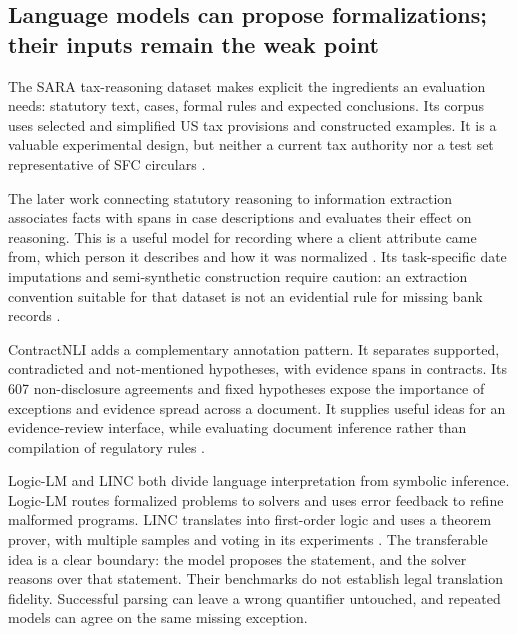 \subsection{Language models can propose formalizations; their inputs remain the weak point}
\label{merge:P-02-literature:07}


The SARA tax-reasoning dataset makes explicit the ingredients an evaluation needs:
statutory text, cases, formal rules and expected conclusions. Its corpus uses
selected and simplified US tax provisions and constructed examples. It is a
valuable experimental design, but neither a current tax authority nor a test set
representative of SFC circulars \citep[secs.~2--3]{sara2020}.

The later work connecting statutory reasoning to information extraction associates
facts with spans in case descriptions and evaluates their effect on reasoning.
This is a useful model for recording where a client attribute came from, which
person it describes and how it was normalized
\citep[secs.~3--5]{connecting2023}. Its task-specific date imputations and
semi-synthetic construction require caution: an extraction convention suitable
for that dataset is not an evidential rule for missing bank records
\citep[sec.~7 and apps.~B, E]{connecting2023}.


ContractNLI adds a complementary annotation pattern. It separates supported,
contradicted and not-mentioned hypotheses, with evidence spans in contracts.
Its 607 non-disclosure agreements and fixed hypotheses expose the importance of
exceptions and evidence spread across a document. It supplies useful ideas for
an evidence-review interface, while evaluating document inference rather than
compilation of regulatory rules \citep[secs.~2--5]{contractnli2021}.

Logic-LM and LINC both divide language interpretation from symbolic inference.
Logic-LM routes formalized problems to solvers and uses error feedback to refine
malformed programs. LINC translates into first-order logic and uses a theorem
prover, with multiple samples and voting in its experiments
\citep[sec.~3]{logiclm2023} \citep[secs.~2--5]{linc2023}. The transferable idea is a
clear boundary: the model proposes the statement, and the solver reasons over
that statement. Their benchmarks do not establish legal translation fidelity.
Successful parsing can leave a wrong quantifier untouched, and repeated models
can agree on the same missing exception.

